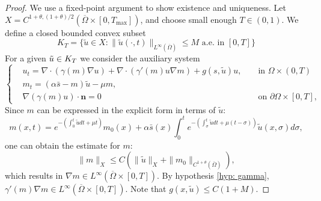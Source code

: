 \documentclass{article}
\begin{document}
    \begin{proof} We use a fixed-point argument to show existence and uniqueness. 
    Let $X=C^{1+\theta,(1+\theta)/2}(\overline{\Omega}\times [0,T_{\max}])$, and choose small enough $T\in (0,1)$. We define a closed bounded convex subset 
    \begin{equation*}
        K_T = \{ \tilde u\in X: \|\tilde u(\cdot,t)\|_{L^\infty(\overline{\Omega})}  \le M \text{ a.e. in } [0,T]\} 
    \end{equation*}
    For a given 
    $\Tilde{u}\in K_T$ we consider the auxiliary system
    \begin{equation}\label{eqn:aux}
\left\{\begin{aligned}
    &u_t = \nabla \cdot (\gamma(m)\nabla u) + \nabla\cdot (\gamma'(m)u\nabla m) +  g(s,\tilde u)u,  && \text{ in }\Omega \times (0,T)\\
    &m_t = (\alpha \bar s -  m) \tilde u-\mu m,\\
    &\nabla (\gamma(m)u) \cdot \textbf{n}=0 && \text{ on }\partial \Omega\times [0,T],
\end{aligned}\right.
\end{equation}
        Since $m$ can be expressed in the explicit form in terms of $\tilde u$:
        \begin{equation*}
            m(x,t) = e^{-(\int_0^t\tilde udt +\mu t)}m_0(x)+ \alpha \bar s(x)\int_0^t e^{-(\int_\sigma^t\tilde u dt+\mu(t-\sigma))}\tilde u(x,\sigma)d\sigma,
        \end{equation*} one can obtain the estimate for $m$:
        \begin{equation*}
            \|m\|_{X}\le C(\|\tilde u\|_{X} + \|m_0\|_{C^{1+\theta}(\overline{\Omega})}),
        \end{equation*} which results in $\nabla m\in L^{\infty}(\overline\Omega \times [0,T])$. By hypothesis \eqref{hyp: gamma}, $\gamma'(m)\nabla m \in L^{\infty}(\overline\Omega\times [0,T])$. Note that $g(x,\tilde u)\le C(1+M)$. 
        

\end{proof}
\end{document}
